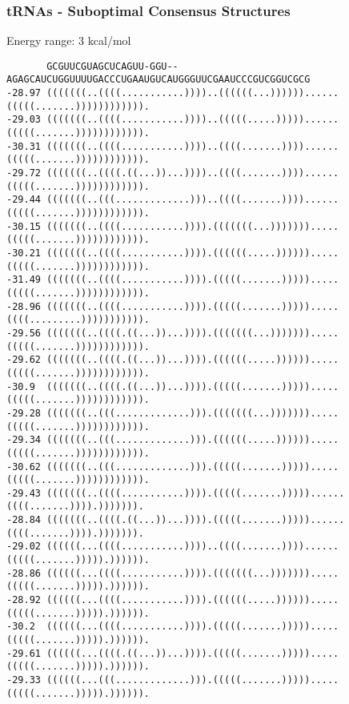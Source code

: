 \documentclass[ignorenonframetext,10pt]{beamer}
\begin{document}
\begin{frame}[fragile]
  \frametitle{tRNAs - Suboptimal Consensus Structures}
  \scriptsize
  \begin{block}{\small Energy range: 3 kcal/mol}
    \begin{verbatim}
       GCGUUCGUAGCUCAGUU-GGU--AGAGCAUCUGGUUUUGACCCUGAAUGUCAUGGGUUCGAAUCCCGUCGGUCGCG
-28.97 (((((((..((((...........))))..((((((...))))))......(((((.......)))))))))))).
-29.03 (((((((..((((...........))))..(((((.....)))))......(((((.......)))))))))))).
-30.31 (((((((..((((...........))))..((((.......))))......(((((.......)))))))))))).
-29.72 (((((((..((((.((...))...))))..((((.......))))......(((((.......)))))))))))).
-29.44 (((((((..(((.............)))..((((.......))))......(((((.......)))))))))))).
-30.15 (((((((..((((...........)))).(((((((...))))))).....(((((.......)))))))))))).
-30.21 (((((((..((((...........)))).((((((.....)))))).....(((((.......)))))))))))).
-31.49 (((((((..((((...........)))).(((((.......))))).....(((((.......)))))))))))).
-28.96 (((((((..((((...........)))).(((((.......))))).....((((.........))))))))))).
-29.56 (((((((..((((.((...))...)))).(((((((...))))))).....(((((.......)))))))))))).
-29.62 (((((((..((((.((...))...)))).((((((.....)))))).....(((((.......)))))))))))).
-30.9  (((((((..((((.((...))...)))).(((((.......))))).....(((((.......)))))))))))).
-29.28 (((((((..(((.............))).(((((((...))))))).....(((((.......)))))))))))).
-29.34 (((((((..(((.............))).((((((.....)))))).....(((((.......)))))))))))).
-30.62 (((((((..(((.............))).(((((.......))))).....(((((.......)))))))))))).
-29.43 (((((((..((((...........)))).(((((.......)))))......((((.......)))).))))))).
-28.84 (((((((..((((.((...))...)))).(((((.......)))))......((((.......)))).))))))).
-29.02 ((((((...((((...........))))..((((.......))))......(((((.......))))).)))))).
-28.86 ((((((...((((...........)))).(((((((...))))))).....(((((.......))))).)))))).
-28.92 ((((((...((((...........)))).((((((.....)))))).....(((((.......))))).)))))).
-30.2  ((((((...((((...........)))).(((((.......))))).....(((((.......))))).)))))).
-29.61 ((((((...((((.((...))...)))).(((((.......))))).....(((((.......))))).)))))).
-29.33 ((((((...(((.............))).(((((.......))))).....(((((.......))))).)))))).     
    \end{verbatim}
  \end{block}
\end{frame}
\end{document}
